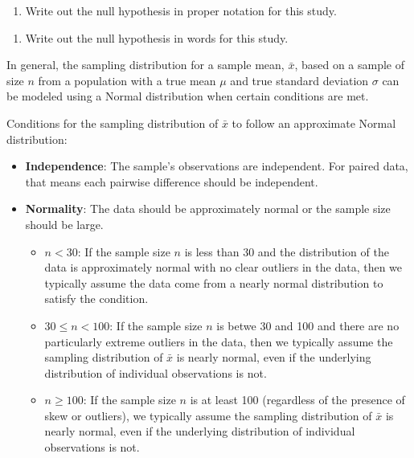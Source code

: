 \documentclass[
]{report}
\providecommand{\tightlist}{%
  \setlength{\itemsep}{0pt}\setlength{\parskip}{0pt}}
\begin{document}
\begin{enumerate}
\def\labelenumi{\arabic{enumi}.}
\tightlist
\item
  Write out the null hypothesis in proper notation for this study.
\end{enumerate}

\vspace{0.8in}

\begin{enumerate}
\def\labelenumi{\arabic{enumi}.}
\setcounter{enumi}{1}
\tightlist
\item
  Write out the null hypothesis in words for this study.
\end{enumerate}

\vspace{0.5in}

In general, the sampling distribution for a sample mean, \(\bar{x}\), based on a sample of size \(n\) from a population with a true mean \(\mu\) and true standard deviation \(\sigma\) can be modeled using a Normal distribution when certain conditions are met.

Conditions for the sampling distribution of \(\bar{x}\) to follow an approximate Normal distribution:

\begin{itemize}
\item
  \textbf{Independence}: The sample's observations are independent. For paired data, that means each pairwise difference should be independent.
\item
  \textbf{Normality}: The data should be approximately normal or the sample size should be large.

  \begin{itemize}
  \item
    \(n < 30\): If the sample size \(n\) is less than 30 and the distribution of the data is approximately normal with no clear outliers in the data, then we typically assume the data come from a nearly normal distribution to satisfy the condition.
  \item
    \(30 \leq n < 100\): If the sample size \(n\) is betwe 30 and 100 and there are no particularly extreme outliers in the data, then we typically assume the sampling distribution of \(\bar{x}\) is nearly normal, even if the underlying distribution of individual observations is not.
  \item
    \(n \geq 100\): If the sample size \(n\) is at least 100 (regardless of the presence of skew or outliers), we typically assume the sampling distribution of \(\bar{x}\) is nearly normal, even if the underlying distribution of individual observations is not.
  \end{itemize}
\end{itemize}
\end{document}
